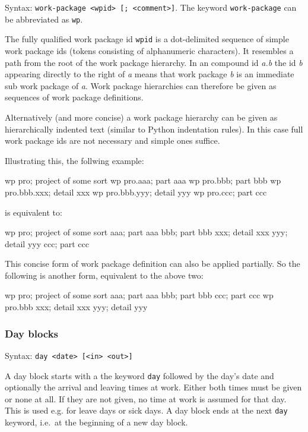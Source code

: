 \documentclass[11pt]{article}
\begin{document}
Syntax: \verb:work-package <wpid> [; <comment>]:.
The keyword \verb:work-package: can be abbreviated as \verb:wp:.

The fully qualified work package id \verb:wpid: is a dot-delimited sequence of simple work package ids (tokens consisting of alphanumeric characters). It resembles a path from the root of the work package hierarchy. In an compound id \emph{a.b} the id \emph{b} appearing directly to the right of \emph{a} means that work package \emph{b} is an immediate sub work package of \emph{a}. Work package hierarchies can therefore be given as sequences of work package definitions.

Alternatively (and more concise) a work package hierarchy can be given as hierarchically indented text (similar to Python indentation rules). In this case full work package ids are not necessary and simple ones suffice.

Illustrating this, the follwing example:

\begin{inputfile}
wp pro; project of some sort
wp pro.aaa; part aaa
wp pro.bbb; part bbb
wp pro.bbb.xxx; detail xxx
wp pro.bbb.yyy; detail yyy
wp pro.ccc; part ccc
\end{inputfile}

is equivalent to:

\begin{inputfile}
wp pro; project of some sort
    aaa; part aaa
    bbb; part bbb
        xxx; detail xxx
        yyy; detail yyy
    ccc; part ccc
\end{inputfile}

This concise form of work package definition can also be applied partially. So the following is another form, equivalent to the above two:

\begin{inputfile}
wp pro; project of some sort
    aaa; part aaa
    bbb; part bbb
    ccc; part ccc
wp pro.bbb
    xxx; detail xxx
    yyy; detail yyy
\end{inputfile}

\subsubsection{Day blocks}

Syntax: \verb:day <date> [<in> <out>]:

A day block starts with a the keyword \verb:day: followed by the day's date and optionally the arrival and leaving times at work. Either both times must be given or none at all. If they are not given, no time at work is assumed for that day. This is used e.g. for leave days or sick days. A day block ends at the next \verb:day: keyword, i.e.\ at the beginning of a new day block.
\end{document}
